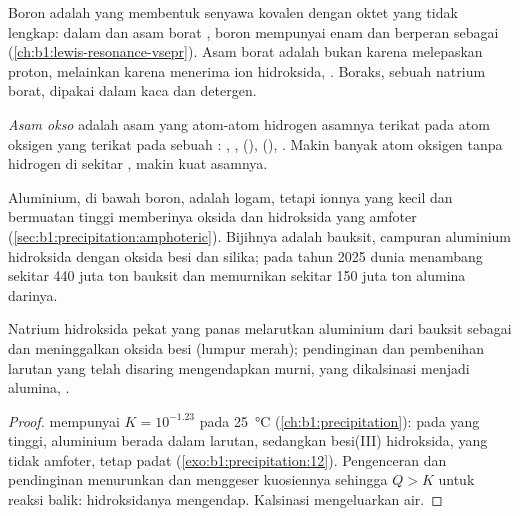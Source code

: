 Boron adalah  yang membentuk senyawa kovalen dengan oktet yang
tidak lengkap: dalam  dan asam borat , boron mempunyai
enam  dan berperan sebagai 
(\cref{ch:b1:lewis-resonance-vsepr}). Asam borat adalah  bukan
karena melepaskan proton, melainkan karena menerima ion hidroksida,
. Boraks, sebuah natrium borat,
dipakai dalam kaca dan detergen.

\begin{definition}\label{def:b1:p-block-13-15:oxoacid}
\emph{Asam okso} adalah asam yang atom-atom hidrogen
asamnya terikat pada atom oksigen yang terikat pada sebuah :
, ,  (), 
(), . Makin banyak atom oksigen tanpa hidrogen di
sekitar , makin kuat asamnya.
\end{definition}

Aluminium, di bawah boron, adalah logam, tetapi ionnya yang kecil dan
bermuatan tinggi memberinya oksida dan hidroksida yang amfoter
(\cref{sec:b1:precipitation:amphoteric}). Bijihnya adalah bauksit,
campuran aluminium hidroksida dengan oksida besi dan silika; pada tahun
2025 dunia menambang sekitar 440 juta ton bauksit dan memurnikan sekitar
150 juta ton alumina darinya.

\begin{proposition}\label{prop:b1:p-block-13-15:bayer}
Natrium hidroksida pekat yang panas melarutkan aluminium dari bauksit
sebagai  dan meninggalkan oksida besi (lumpur merah);
pendinginan dan pembenihan larutan yang telah disaring mengendapkan
 murni, yang dikalsinasi menjadi alumina,
.
\end{proposition}

\begin{proof}
 mempunyai $K = 10^{-1.23}$ pada
\qty{25}{\celsius} (\cref{ch:b1:precipitation}): pada \ce{[OH-]} yang
tinggi, aluminium berada dalam larutan, sedangkan besi(III) hidroksida,
yang tidak amfoter, tetap padat (\cref{exo:b1:precipitation:12}).
Pengenceran dan pendinginan menurunkan \ce{[OH-]} dan menggeser kuosiennya
sehingga $Q > K$ untuk reaksi balik: hidroksidanya mengendap. Kalsinasi
mengeluarkan air.
\end{proof}

